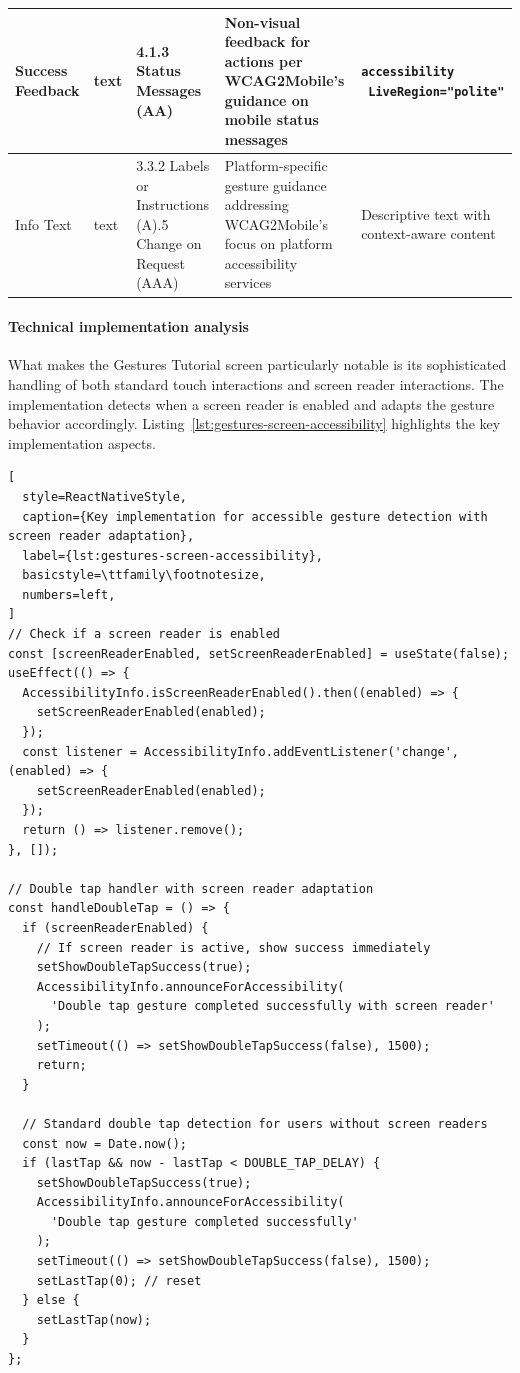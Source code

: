 \begin{longtable}[c]{|C{2.5cm}|C{2cm}|C{2.8cm}|C{3.5cm}|C{4.7cm}|}
\hline
Success Feedback & text & 4.1.3 Status Messages (AA) & Non-visual feedback for actions per WCAG2Mobile's guidance on mobile status messages & \texttt{accessibility \ LiveRegion="polite"} \\
\hline
Info Text & text & 3.3.2 Labels or Instructions (A).5 Change on Request (AAA) & Platform-specific gesture guidance addressing WCAG2Mobile's focus on platform accessibility services & Descriptive text with context-aware content \\
\hline
\end{longtable}
\FloatBarrier

\paragraph{Technical implementation analysis}

What makes the Gestures Tutorial screen particularly notable is its sophisticated handling of both standard touch interactions and screen reader interactions. The implementation detects when a screen reader is enabled and adapts the gesture behavior accordingly. Listing~\ref{lst:gestures-screen-accessibility} highlights the key implementation aspects.

\begin{lstlisting}[
  style=ReactNativeStyle,
  caption={Key implementation for accessible gesture detection with screen reader adaptation},
  label={lst:gestures-screen-accessibility},
  basicstyle=\ttfamily\footnotesize,
  numbers=left,
]
// Check if a screen reader is enabled
const [screenReaderEnabled, setScreenReaderEnabled] = useState(false);
useEffect(() => {
  AccessibilityInfo.isScreenReaderEnabled().then((enabled) => {
    setScreenReaderEnabled(enabled);
  });
  const listener = AccessibilityInfo.addEventListener('change', (enabled) => {
    setScreenReaderEnabled(enabled);
  });
  return () => listener.remove();
}, []);

// Double tap handler with screen reader adaptation
const handleDoubleTap = () => {
  if (screenReaderEnabled) {
    // If screen reader is active, show success immediately
    setShowDoubleTapSuccess(true);
    AccessibilityInfo.announceForAccessibility(
      'Double tap gesture completed successfully with screen reader'
    );
    setTimeout(() => setShowDoubleTapSuccess(false), 1500);
    return;
  }

  // Standard double tap detection for users without screen readers
  const now = Date.now();
  if (lastTap && now - lastTap < DOUBLE_TAP_DELAY) {
    setShowDoubleTapSuccess(true);
    AccessibilityInfo.announceForAccessibility(
      'Double tap gesture completed successfully'
    );
    setTimeout(() => setShowDoubleTapSuccess(false), 1500);
    setLastTap(0); // reset
  } else {
    setLastTap(now);
  }
};
\end{lstlisting}
\FloatBarrier

